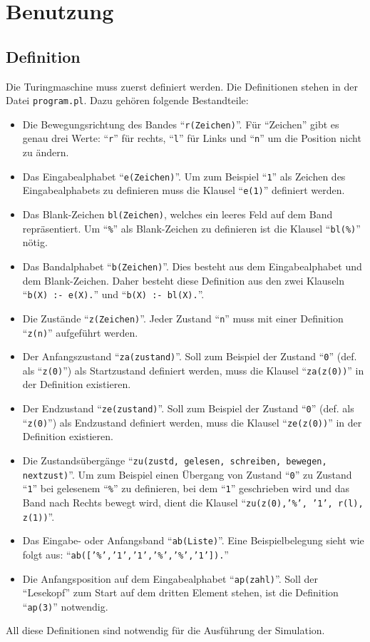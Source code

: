 \documentclass[final,a4paper,11pt,notitlepage,halfparskip]{scrreprt}
\begin{document}
\chapter{Benutzung}

\section{Definition}
Die Turingmaschine muss zuerst definiert werden. Die Definitionen stehen
in der Datei \texttt{program.pl}. Dazu gehören folgende Bestandteile:
\begin{itemize}
    \item Die Bewegungsrichtung des Bandes "`\texttt{r(Zeichen)}"'. Für
	"`Zeichen"' gibt es genau drei Werte: "`\texttt{r}"' für rechts,
	"`\texttt{l}"' für Links und "`\texttt{n}"' um die Position nicht 
	zu ändern.
    \item Das Eingabealphabet "`\texttt{e(Zeichen)}"'. Um zum Beispiel
	"`\texttt{1}"' als Zeichen des Eingabealphabets zu definieren
	muss die Klausel "`\texttt{e(1)}"' definiert werden.
    \item Das Blank-Zeichen \texttt{bl(Zeichen)}, welches ein leeres
	Feld auf dem Band repräsentiert. Um "`\texttt{\%}"' als
	Blank-Zeichen zu definieren ist die Klausel "`\texttt{bl(\%)}"'
	nötig.	
    \item Das Bandalphabet "`\texttt{b(Zeichen)}"'. Dies besteht aus 
	dem Eingabealphabet und dem Blank-Zeichen. Daher besteht diese 
	Definition aus den zwei Klauseln "`\texttt{b(X) :- e(X).}"' 
	und "`\texttt{b(X) :- bl(X).}"'.
    \item Die Zustände "`\texttt{z(Zeichen)}"'. Jeder Zustand
	"`\texttt{n}"' muss mit einer Definition "`\texttt{z(n)}"' 
	aufgeführt werden.	
    \item Der Anfangszustand "`\texttt{za(zustand)}"'. Soll zum 
	Beispiel der Zustand "`\texttt{0}"' (def. als "`\texttt{z(0)}"') 
	als Startzustand definiert werden, muss die Klausel
	"`\texttt{za(z(0))}"' in der Definition existieren.
    \item Der Endzustand "`\texttt{ze(zustand)}"'. Soll zum 
	Beispiel der Zustand "`\texttt{0}"' (def. als "`\texttt{z(0)}"') 
	als Endzustand definiert werden, muss die Klausel
	"`\texttt{ze(z(0))}"' in der Definition existieren.
    \item Die Zustandsübergänge 
	"`\texttt{zu(zustd, gelesen, schreiben, bewegen, nextzust)}"'.
	Um zum Beispiel einen Übergang von Zustand "`\texttt{0}"' zu
	Zustand "`\texttt{1}"' bei gelesenem "`\texttt{\%}"' zu
	definieren, bei dem "`\texttt{1}"' geschrieben wird und das Band
	nach Rechts bewegt wird, dient die Klausel 
	"`\texttt{zu(z(0),'\%', '1',  r(l), z(1))}"'.
    \item Das Eingabe- oder Anfangsband "`\texttt{ab(Liste)}"'. Eine
	Beispielbelegung sieht wie folgt aus:
	"`\texttt{ab(['\%','1','1','\%','\%','1']).}"'	
    \item Die Anfangsposition auf dem Eingabealphabet
	"`\texttt{ap(zahl)}"'. Soll der "`Lesekopf"' zum Start auf dem
	dritten Element stehen, ist die Definition "`\texttt{ap(3)}"'
	notwendig.	
\end{itemize}
All diese Definitionen sind notwendig für die Ausführung der Simulation.
\end{document}
